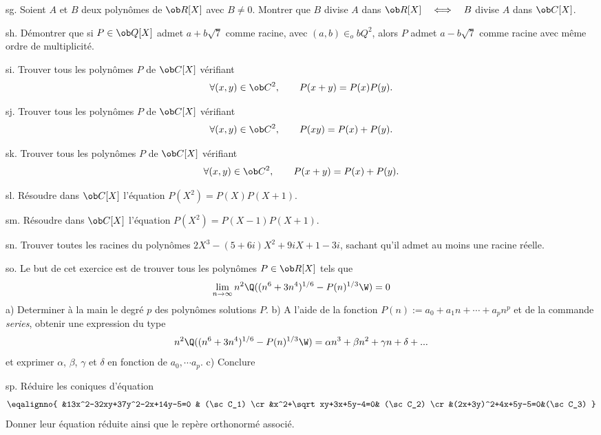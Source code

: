 \exo  [Level=1,Fight=1,Learn=1,Field=\Polynômes,Type=\Exercices,Origin=] sg. 
Soient $A$ et $B$ deux polynômes de $\ob R[X]$ avec $B\neq0$. \pn
Montrer que $B$ divise $A$ dans $\ob R[X]\quad\Longleftrightarrow\quad B$ divise $A$ dans $\ob C[X]$. 

\exo  [Level=1,Fight=1,Learn=1,Field=\Polynômes,Type=\Exercices,Origin=] sh. 
Démontrer que si $P\in\ob Q[X]$ admet $a+b\sqrt7$ comme racine, avec $(a,b)\in_ob Q^2$, alors $P$ admet $a-b\sqrt7$ comme racine avec même ordre de multiplicité. 

\exo  [Level=1,Fight=1,Learn=1,Field=\Polynômes,Type=\Exercices,Origin=] si. 
Trouver tous les polynômes $P$ de $\ob C[X]$ vérifiant 
$$
\forall (x,y)\in\ob C^2, \qquad P(x+y)=P(x)P(y). 
$$

\exo  [Level=1,Fight=1,Learn=1,Field=\Polynômes,Type=\Exercices,Origin=] sj. 
Trouver tous les polynômes $P$ de $\ob C[X]$ vérifiant 
$$
\forall (x,y)\in\ob C^2, \qquad P(xy)=P(x)+P(y). 
$$

\exo  [Level=1,Fight=1,Learn=1,Field=\Polynômes,Type=\Exercices,Origin=] sk. 
Trouver tous les polynômes $P$ de $\ob C[X]$ vérifiant 
$$
\forall (x,y)\in\ob C^2, \qquad P(x+y)=P(x)+P(y). 
$$

\exo [Level=1,Fight=1,Learn=1,Field=\Polynômes,Type=\Exercices,Origin=] sl. 
Résoudre dans $\ob C[X]$ l'équation $P(X^2)=P(X)P(X+1)$. 

\exo [Level=1,Fight=1,Learn=1,Field=\Polynômes,Type=\Exercices,Origin=]  sm. 
Résoudre dans $\ob C[X]$ l'équation $P(X^2)=P(X-1)P(X+1)$. 


\exo [Level=1,Fight=1,Learn=1,Field=\Polynômes,Type=\Exercices,Origin=]  sn. 
Trouver toutes les racines du polynômes $2X^3-(5+6i)X^2+9iX+1-3i$, sachant qu'il admet au moins une racine réelle. 

\exo [Level=1,Fight=1,Learn=1,Field=\Polynômes,Type=\Maple,Origin=] so. 
Le but de cet exercice est de trouver tous les polynômes $P\in\ob R[X]$ tels que 
$$
\lim_{n\to\infty} n^2\Q((n^6+3n^4)^{1/6}-P(n)^{1/3}\W)=0 
$$
a) Determiner à la main le degré $p$ des polynômes solutions $P$. \pn
b) A l'aide de la fonction  $P(n):=a_0+a_1n+\cdots+a_pn^p$ et de la commande {\it series}, obtenir une expression du type
$$
 n^2\Q((n^6+3n^4)^{1/6}-P(n)^{1/3}\W)=\alpha n^3+ \beta n^2+\gamma n+\delta+... 
$$
et exprimer $\alpha$, $\beta$, $\gamma$ et $\delta$ en fonction de $a_0, \cdots a_p$. \pn
c) Conclure

\exo  [Level=1,Fight=0,Learn=0,Field=\Coniques,Type=\Exercices,Origin=] sp. 
Réduire les coniques d'équation 
$$
\eqalignno{
&13x^2-32xy+37y^2-2x+14y-5=0
& (\sc C_1)
\cr
&x^2+\sqrt xy+3x+5y-4=0& (\sc C_2)
\cr
&(2x+3y)^2+4x+5y-5=0&(\sc C_3)
}
$$
Donner leur équation réduite ainsi que le repère orthonormé associé. 

